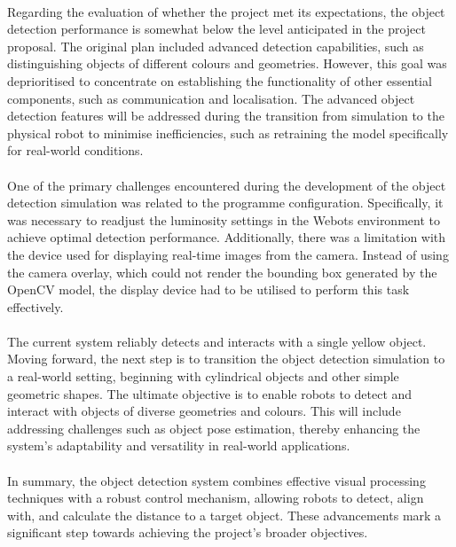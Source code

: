 \paragraph*{}
Regarding the evaluation of whether the project met its expectations, the object detection performance is somewhat below the level anticipated in the project proposal. The original plan included advanced detection capabilities, such as distinguishing objects of different colours and geometries. However, this goal was deprioritised to concentrate on establishing the functionality of other essential components, such as communication and localisation. The advanced object detection features will be addressed during the transition from simulation to the physical robot to minimise inefficiencies, such as retraining the model specifically for real-world conditions.

\paragraph*{}
One of the primary challenges encountered during the development of the object detection simulation was related to the programme configuration. Specifically, it was necessary to readjust the luminosity settings in the Webots environment to achieve optimal detection performance. Additionally, there was a limitation with the device used for displaying real-time images from the camera. Instead of using the camera overlay, which could not render the bounding box generated by the OpenCV model, the display device had to be utilised to perform this task effectively.

\paragraph*{}
The current system reliably detects and interacts with a single yellow object. Moving forward, the next step is to transition the object detection simulation to a real-world setting, beginning with cylindrical objects and other simple geometric shapes. The ultimate objective is to enable robots to detect and interact with objects of diverse geometries and colours. This will include addressing challenges such as object pose estimation, thereby enhancing the system's adaptability and versatility in real-world applications.

\paragraph*{}
In summary, the object detection system combines effective visual processing techniques with a robust control mechanism, allowing robots to detect, align with, and calculate the distance to a target object. These advancements mark a significant step towards achieving the project's broader objectives.


